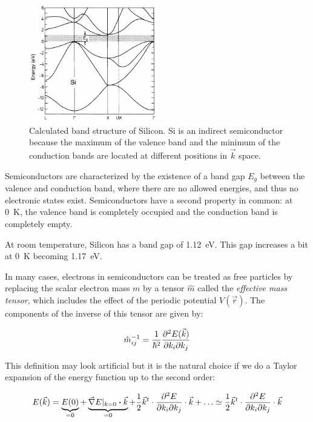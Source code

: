 \documentclass[11pt,a4paper]{article}
\begin{document}
\begin{figure}[ht]
\centering
\includegraphics[width=0.5\textwidth]{Si_band_structure}
\caption{Calculated band structure of Silicon. Si is an indirect semiconductor because the maximum of the valence band and the minimum of the conduction bands are located at different positions in $\vec{k}$ space.\cite{ibach2009solid}}
\label{fig:silicon_band_structure}
\end{figure}

Semiconductors are characterized by the existence of a band gap $E_g$ between the valence and conduction band, where there are no allowed energies, and thus no electronic states exist. Semiconductors have a second property in common: at \SI{0}{\kelvin}, the valence band is completely occupied and the conduction band is completely empty.

At room temperature, Silicon has a band gap of \SI{1.12}{\electronvolt}. This gap increases a bit at \SI{0}{\kelvin} becoming \SI{1.17}{\electronvolt}.

In many cases, electrons in semiconductors can be treated as free particles by replacing the scalar electron mass $m$ by a tensor $\hat{m}$ called the \emph{effective mass tensor}, which includes the effect of the periodic potential $V(\vec{r})$. The components of the inverse of this tensor are given by:

\begin{equation}\label{eq:mass_tensor}
\hat{m}_{ij}^{-1}=\frac{1}{\hbar^2}\pdv[2]{E(\vec{k})}{k_i}{k_j}
\end{equation}

This definition may look artificial but it is the natural choice if we do a Taylor expansion of the energy function up to the second order:

\begin{equation}\label{eq:dispersion_energy}
E(\vec{k})=\underbrace{E(0)}_\text{=0}+\underbrace{\vec{\nabla}E|_{k=0}\vdot \vec{k}}_\text{=0}+\frac{1}{2}\vec{k}^t\cdot\pdv[2]{E}{k_i}{k_j}\cdot\vec{k}+\ldots\simeq\frac{1}{2}\vec{k}^t\cdot\pdv[2]{E}{k_i}{k_j}\cdot\vec{k}
\end{equation}
\end{document}
